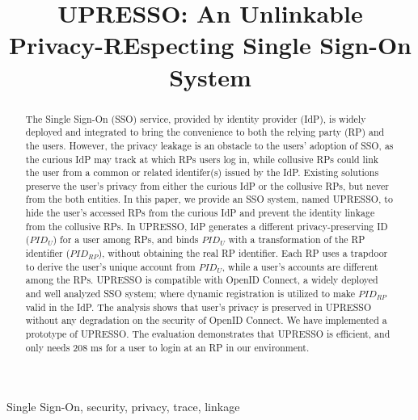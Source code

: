 \documentclass[conference, 10pt]{IEEEtran}
\begin{document}
\title{{UPRESSO}: An Unlinkable Privacy-REspecting Single Sign-On System}
\maketitle
\begin{abstract}
 The Single Sign-On (SSO) service, provided by identity provider (IdP),  is widely deployed and integrated to bring the convenience to both the relying party (RP) and the users.
 However, the privacy leakage is an obstacle to the users' adoption of SSO,
 as the curious IdP may track at which RPs users log in,
while collusive RPs could link the user from a common or related identifer(s) issued by the IdP.
 Existing solutions preserve the user's privacy  from either the curious IdP or the collusive RPs, but never from the both entities.
In this paper, we provide an SSO system, named UPRESSO, to hide the user's accessed RPs from the curious IdP
and prevent the identity linkage from the collusive RPs.
In UPRESSO, IdP generates a different privacy-preserving ID ($PID_U$) for a user among RPs, and binds $PID_U$ with a transformation of the RP identifier ($PID_{RP}$), without obtaining the real RP identifier.
Each RP uses a trapdoor to derive the user's unique account from $PID_U$,
while a user's accounts are different among the RPs.
UPRESSO  is compatible with OpenID Connect, a widely deployed and well analyzed SSO system;
    where dynamic registration is utilized to make $PID_{RP}$ valid in the IdP.
The analysis shows that user's privacy is preserved in UPRESSO without any degradation on the security of OpenID Connect.
We have implemented a prototype of UPRESSO. The evaluation demonstrates that UPRESSO is efficient, and only needs 208 ms for a user to login at an RP in our environment.
\end{abstract}
\begin{IEEEkeywords}
Single Sign-On, security, privacy, trace, linkage
\end{IEEEkeywords}















\end{document}
